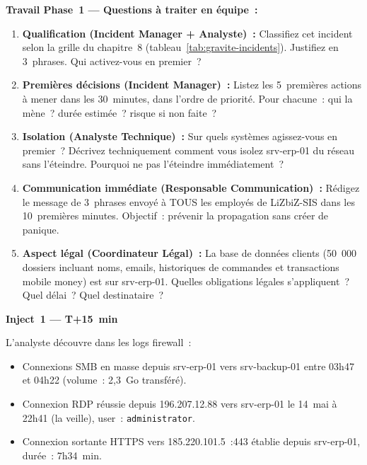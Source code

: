 \begin{boxexo}
\textbf{Travail Phase~1 — Questions à traiter en équipe~:}

\begin{enumerate}
  \item \textbf{Qualification (Incident Manager + Analyste)~:}
        Classifiez cet incident selon la grille du chapitre~8
        (tableau~\ref{tab:gravite-incidents}). Justifiez en 3~phrases.
        Qui activez-vous en premier~?

  \item \textbf{Premières décisions (Incident Manager)~:}
        Listez les 5~premières actions à mener dans les 30~minutes,
        dans l'ordre de priorité. Pour chacune~: qui la mène~?
        durée estimée~? risque si non faite~?

  \item \textbf{Isolation (Analyste Technique)~:}
        Sur quels systèmes agissez-vous en premier~? Décrivez
        techniquement comment vous isolez srv-erp-01 du réseau
        sans l'éteindre. Pourquoi ne pas l'éteindre immédiatement~?

  \item \textbf{Communication immédiate (Responsable Communication)~:}
        Rédigez le message de 3~phrases envoyé à TOUS les employés
        de LiZbiZ-SIS dans les 10~premières minutes. Objectif~:
        prévenir la propagation sans créer de panique.

  \item \textbf{Aspect légal (Coordinateur Légal)~:}
        La base de données clients (50~000 dossiers incluant noms,
        emails, historiques de commandes et transactions mobile money)
        est sur srv-erp-01. Quelles obligations légales s'appliquent~?
        Quel délai~? Quel destinataire~?
\end{enumerate}
\end{boxexo}

\begin{boxlizbiz}
\textbf{Inject~1 — T+15~min}

L'analyste découvre dans les logs firewall~:
\begin{itemize}
  \item Connexions SMB en masse depuis srv-erp-01 vers srv-backup-01
    entre 03h47 et 04h22 (volume~: 2,3~Go transféré).
  \item Connexion RDP réussie depuis 196.207.12.88 vers srv-erp-01
    le 14~mai à 22h41 (la veille), user~: \texttt{administrator}.
  \item Connexion sortante HTTPS vers 185.220.101.5~:443 établie
    depuis srv-erp-01, durée~: 7h34~min.
\end{itemize}
\end{boxlizbiz}


